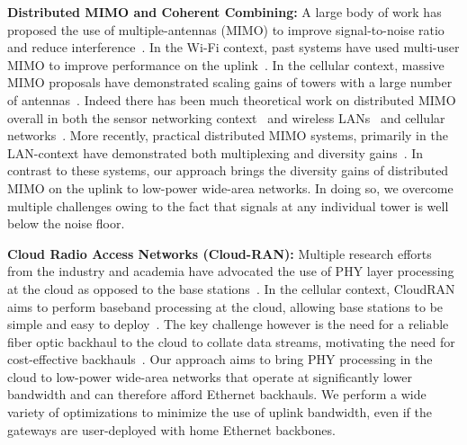 \noindent \textbf{Distributed MIMO and Coherent Combining: } A large body of work has proposed the use of multiple-antennas (MIMO) to improve signal-to-noise ratio and reduce interference~\cite{xie2014scalable, lin2011random, kumar2013bringing}. In the Wi-Fi context, past systems have used multi-user MIMO to improve performance on the uplink~\cite{shen2014rate, tan2009sam, xie2014scalable}. In the cellular context, massive MIMO proposals have demonstrated scaling gains of towers with a large number of antennas~\cite{shepard2012argos, larsson2014massive}. Indeed there has been much theoretical work on distributed MIMO overall in both the sensor networking context~\cite{del2007cooperative} and wireless LANs~\cite{dohler2004resource} and cellular networks~\cite{sawahashi2010coordinated}.  More recently, practical distributed MIMO systems, primarily in the LAN-context have demonstrated both multiplexing and diversity gains~\cite{hamed2016real, yenamandra2014vidyut, rahul2012jmb}. In contrast to these systems, our approach brings the diversity gains of distributed MIMO on the uplink to low-power wide-area networks. In doing so, we overcome multiple challenges owing to the fact that signals at any individual tower is well below the noise floor. \\\vspace*{-0.1in}


\noindent \textbf{Cloud Radio Access Networks (Cloud-RAN): } Multiple research efforts from the industry and academia have advocated the use of PHY layer processing at the cloud as opposed to the base stations~\cite{sabella2013ran, hadzialic2013cloud}. In the cellular context, CloudRAN aims to perform baseband processing at the cloud, allowing base stations to be simple and easy to deploy~\cite{checko2015cloud, wubben2014benefits}. The key challenge however is the need for a reliable fiber optic backhaul to the cloud to collate data streams, motivating the need for cost-effective backhauls~\cite{liu2013case, chih2014recent}. Our approach aims to bring PHY processing in the cloud to low-power wide-area networks that operate at significantly lower bandwidth and can therefore afford Ethernet backhauls. We perform a wide variety of optimizations to minimize the use of uplink bandwidth, even if the gateways are user-deployed with home Ethernet backbones. 



